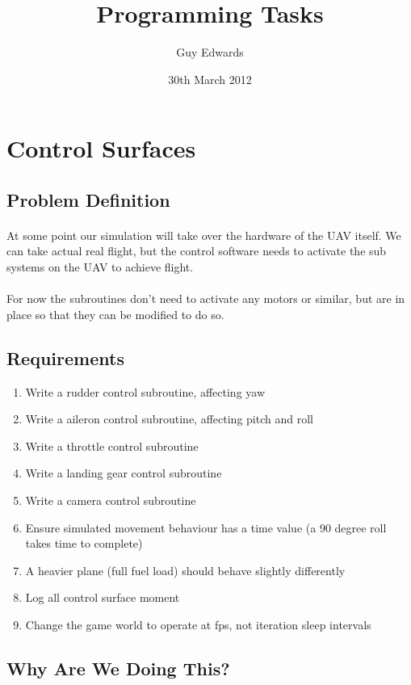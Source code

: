 \documentclass[11pt]{book}
\title{\textbf{Programming Tasks}}
\author{Guy Edwards}
\date{30th March 2012}
\begin{document}
\section{Control Surfaces}

\subsection{Problem Definition}

\paragraph{} At some point our simulation will take over the hardware of the UAV itself. We can take actual real flight, but the control software needs to activate the sub systems on the UAV to achieve flight.

\paragraph{} For now the subroutines don't need to activate any motors or similar, but are in place so that they can be modified to do so.

\subsection{Requirements}

\begin{enumerate}
\item Write a rudder control subroutine, affecting yaw
\item Write a aileron control subroutine, affecting pitch and roll
\item Write a throttle control subroutine
\item Write a landing gear control subroutine
\item Write a camera control subroutine
\item Ensure simulated movement behaviour has a time value (a 90 degree roll takes time to complete)
\item A heavier plane (full fuel load) should behave slightly differently
\item Log all control surface moment
\item Change the game world to operate at fps, not iteration sleep intervals
\end{enumerate}

\subsection{Why Are We Doing This?}
\end{document}
